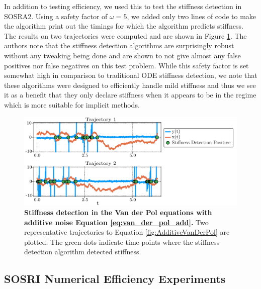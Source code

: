 \documentclass{article}
\begin{document}
In addition to testing efficiency, we used this to test the stiffness
detection in SOSRA2. Using a safety factor of $\omega=5$, we added
only two lines of code to make the algorithm print out the timings
for which the algorithm predicts stiffness. The results on two trajectories
were computed and are shown in Figure \ref{fig:Stiffness-detection-in-additive}.
The authors note that the stiffness detection algorithms are surprisingly
robust without any tweaking being done and are shown to not give almost
any false positives nor false negatives on this test problem. While
this safety factor is set somewhat high in comparison to traditional
ODE stiffness detection, we note that these algorithms were designed
to efficiently handle mild stiffness and thus we see it as a benefit
that they only declare stiffness when it appears to be in the regime
which is more suitable for implicit methods.
\begin{center}
	\begin{figure}
		\begin{centering}
			\includegraphics[scale=0.55]{paper_figures/sde_stiffness_detection}
			\par\end{centering}
		\caption{\textbf{Stiffness detection in the Van der Pol equations with additive
				noise Equation \ref{eq:van_der_pol_add}.} Two representative trajectories
			to Equation \ref{fig:AdditiveVanDerPol} are plotted. The green dots
			indicate time-points where the stiffness detection algorithm detected
			stiffness. \label{fig:Stiffness-detection-in-additive}}
	\end{figure}
	\par\end{center}

\subsection{SOSRI Numerical Efficiency Experiments}
\end{document}
